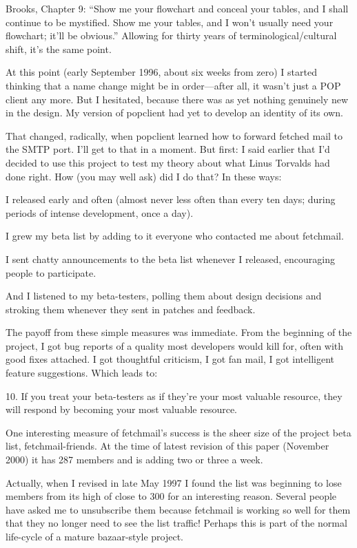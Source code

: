 \documentclass[a4paper,12pt,UTF8,twoside]{ctexbook}
\begin{document}
Brooks, Chapter 9: ``Show me your flowchart and conceal your tables, and I shall continue to be mystified. Show me your tables, and I won't usually need your flowchart; it'll be obvious.'' Allowing for thirty years of terminological/cultural shift, it's the same point.

At this point (early September 1996, about six weeks from zero) I started thinking that a name change might be in order—after all, it wasn't just a POP client any more. But I hesitated, because there was as yet nothing genuinely new in the design. My version of popclient had yet to develop an identity of its own.

That changed, radically, when popclient learned how to forward fetched mail to the SMTP port. I'll get to that in a moment. But first: I said earlier that I'd decided to use this project to test my theory about what Linus Torvalds had done right. How (you may well ask) did I do that? In these ways:

I released early and often (almost never less often than every ten days; during periods of intense development, once a day).

I grew my beta list by adding to it everyone who contacted me about fetchmail.

I sent chatty announcements to the beta list whenever I released, encouraging people to participate.

And I listened to my beta-testers, polling them about design decisions and stroking them whenever they sent in patches and feedback.

The payoff from these simple measures was immediate. From the beginning of the project, I got bug reports of a quality most developers would kill for, often with good fixes attached. I got thoughtful criticism, I got fan mail, I got intelligent feature suggestions. Which leads to:

10. If you treat your beta-testers as if they're your most valuable resource, they will respond by becoming your most valuable resource.

One interesting measure of fetchmail's success is the sheer size of the project beta list, fetchmail-friends. At the time of latest revision of this paper (November 2000) it has 287 members and is adding two or three a week.

Actually, when I revised in late May 1997 I found the list was beginning to lose members from its high of close to 300 for an interesting reason. Several people have asked me to unsubscribe them because fetchmail is working so well for them that they no longer need to see the list traffic! Perhaps this is part of the normal life-cycle of a mature bazaar-style project.
\end{document}
